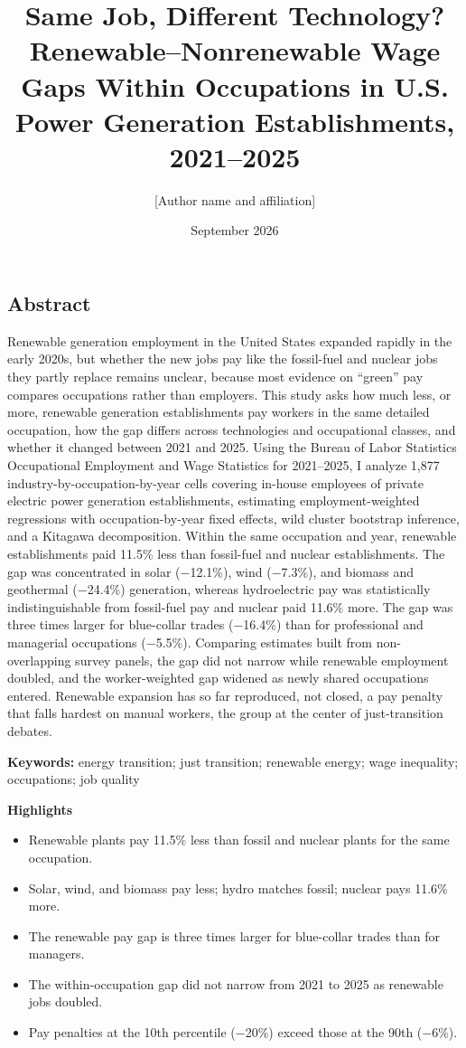 \documentclass[
  11pt,
]{article}
\title{Same Job, Different Technology? Renewable--Nonrenewable Wage Gaps
Within Occupations in U.S. Power Generation Establishments, 2021--2025}
\author{{[}Author name and affiliation{]}}
\date{September 2026}
\providecommand{\tightlist}{%
  \setlength{\itemsep}{0pt}\setlength{\parskip}{0pt}}
\begin{document}
\maketitle

\subsection{Abstract}\label{abstract}

Renewable generation employment in the United States expanded rapidly in
the early 2020s, but whether the new jobs pay like the fossil-fuel and
nuclear jobs they partly replace remains unclear, because most evidence
on ``green'' pay compares occupations rather than employers. This study
asks how much less, or more, renewable generation establishments pay
workers in the same detailed occupation, how the gap differs across
technologies and occupational classes, and whether it changed between
2021 and 2025. Using the Bureau of Labor Statistics Occupational
Employment and Wage Statistics for 2021--2025, I analyze 1,877
industry-by-occupation-by-year cells covering in-house employees of
private electric power generation establishments, estimating
employment-weighted regressions with occupation-by-year fixed effects,
wild cluster bootstrap inference, and a Kitagawa decomposition. Within
the same occupation and year, renewable establishments paid 11.5\% less
than fossil-fuel and nuclear establishments. The gap was concentrated in
solar (−12.1\%), wind (−7.3\%), and biomass and geothermal (−24.4\%)
generation, whereas hydroelectric pay was statistically
indistinguishable from fossil-fuel pay and nuclear paid 11.6\% more. The
gap was three times larger for blue-collar trades (−16.4\%) than for
professional and managerial occupations (−5.5\%). Comparing estimates
built from non-overlapping survey panels, the gap did not narrow while
renewable employment doubled, and the worker-weighted gap widened as
newly shared occupations entered. Renewable expansion has so far
reproduced, not closed, a pay penalty that falls hardest on manual
workers, the group at the center of just-transition debates.

\textbf{Keywords:} energy transition; just transition; renewable energy;
wage inequality; occupations; job quality

\textbf{Highlights}

\begin{itemize}
\tightlist
\item
  Renewable plants pay 11.5\% less than fossil and nuclear plants for
  the same occupation.
\item
  Solar, wind, and biomass pay less; hydro matches fossil; nuclear pays
  11.6\% more.
\item
  The renewable pay gap is three times larger for blue-collar trades
  than for managers.
\item
  The within-occupation gap did not narrow from 2021 to 2025 as
  renewable jobs doubled.
\item
  Pay penalties at the 10th percentile (−20\%) exceed those at the 90th
  (−6\%).
\end{itemize}
\end{document}
